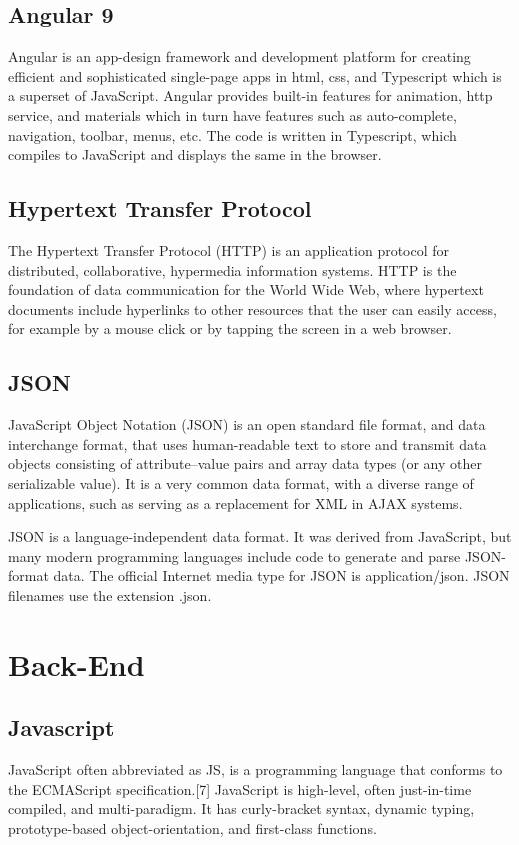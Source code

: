\subsection{Angular 9}
Angular is an app-design framework and development platform for creating efficient and sophisticated single-page apps in html, css, and Typescript which is a superset of JavaScript. Angular provides built-in features for animation, http service, and materials which in turn have features such as auto-complete, navigation, toolbar, menus, etc. The code is written in Typescript, which compiles to JavaScript and displays the same in the browser.
\subsection{Hypertext Transfer Protocol}
The Hypertext Transfer Protocol (HTTP) is an application protocol for distributed, collaborative, hypermedia information systems. HTTP is the foundation of data communication for the World Wide Web, where hypertext documents include hyperlinks to other resources that the user can easily access, for example by a mouse click or by tapping the screen in a web browser.
\subsection{JSON}
JavaScript Object Notation (JSON) is an open standard file format, and data interchange format, that uses human-readable text to store and transmit data objects consisting of attribute–value pairs and array data types (or any other serializable value). It is a very common data format, with a diverse range of applications, such as serving as a replacement for XML in AJAX systems.

JSON is a language-independent data format. It was derived from JavaScript, but many modern programming languages include code to generate and parse JSON-format data. The official Internet media type for JSON is application/json. JSON filenames use the extension .json.



\section{Back-End}
\subsection{Javascript}
JavaScript often abbreviated as JS, is a programming language that conforms to the ECMAScript specification.[7] JavaScript is high-level, often just-in-time compiled, and multi-paradigm. It has curly-bracket syntax, dynamic typing, prototype-based object-orientation, and first-class functions.



